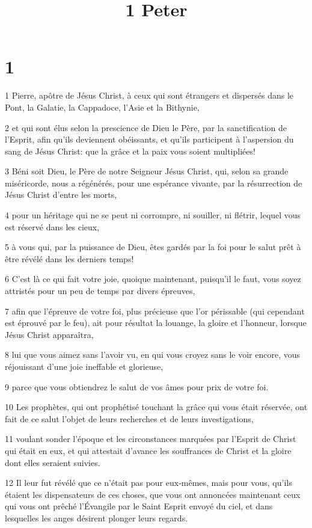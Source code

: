 

\title{1 Peter}


\chapter{1}

\par 1 Pierre, apôtre de Jésus Christ, à ceux qui sont étrangers et dispersés dans le Pont, la Galatie, la Cappadoce, l'Asie et la Bithynie,
\par 2 et qui sont élus selon la prescience de Dieu le Père, par la sanctification de l'Esprit, afin qu'ils deviennent obéissants, et qu'ils participent à l'aspersion du sang de Jésus Christ: que la grâce et la paix vous soient multipliées!
\par 3 Béni soit Dieu, le Père de notre Seigneur Jésus Christ, qui, selon sa grande miséricorde, nous a régénérés, pour une espérance vivante, par la résurrection de Jésus Christ d'entre les morts,
\par 4 pour un héritage qui ne se peut ni corrompre, ni souiller, ni flétrir, lequel vous est réservé dans les cieux,
\par 5 à vous qui, par la puissance de Dieu, êtes gardés par la foi pour le salut prêt à être révélé dans les derniers temps!
\par 6 C'est là ce qui fait votre joie, quoique maintenant, puisqu'il le faut, vous soyez attristés pour un peu de temps par divers épreuves,
\par 7 afin que l'épreuve de votre foi, plus précieuse que l'or périssable (qui cependant est éprouvé par le feu), ait pour résultat la louange, la gloire et l'honneur, lorsque Jésus Christ apparaîtra,
\par 8 lui que vous aimez sans l'avoir vu, en qui vous croyez sans le voir encore, vous réjouissant d'une joie ineffable et glorieuse,
\par 9 parce que vous obtiendrez le salut de vos âmes pour prix de votre foi.
\par 10 Les prophètes, qui ont prophétisé touchant la grâce qui vous était réservée, ont fait de ce salut l'objet de leurs recherches et de leurs investigations,
\par 11 voulant sonder l'époque et les circonstances marquées par l'Esprit de Christ qui était en eux, et qui attestait d'avance les souffrances de Christ et la gloire dont elles seraient suivies.
\par 12 Il leur fut révélé que ce n'était pas pour eux-mêmes, mais pour vous, qu'ils étaient les dispensateurs de ces choses, que vous ont annoncées maintenant ceux qui vous ont prêché l'Évangile par le Saint Esprit envoyé du ciel, et dans lesquelles les anges désirent plonger leurs regards.
